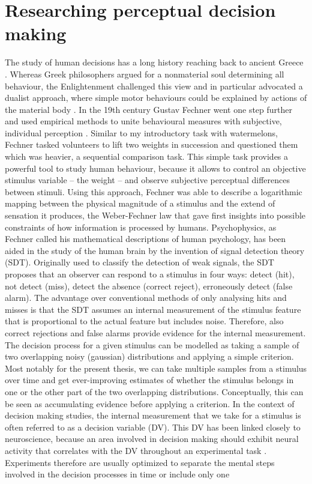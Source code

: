 \section{Researching perceptual decision making}
The study of human decisions has a long history reaching back to ancient Greece \parencite{Aristotle1987,Epicurus1940}. Whereas Greek philosophers argued for a nonmaterial soul determining all behaviour, the Enlightenment challenged this view and in particular \textcite{Descartes1649} advocated a dualist approach, where simple motor behaviours could be explained by actions of the material body \parencite{Descartes1664,Descartes1988}. In the 19th century Gustav Fechner went one step further and used empirical methods
\parencite{Bacon1620} to unite behavioural measures with subjective, individual perception \parencite{Fechner1860}. Similar to my introductory task with watermelons, Fechner tasked volunteers to lift two weights in succession and questioned them which was heavier, a sequential comparison task. This simple task provides a powerful tool to study human behaviour, because it allows to control an objective stimulus variable – the weight – and observe subjective perceptual differences between stimuli. Using this approach, Fechner was able to describe a logarithmic mapping between the physical magnitude of a stimulus and the extend of sensation it produces, the Weber-Fechner law that gave first insights into possible constraints of how information is processed by humans. Psychophysics, as Fechner called his mathematical descriptions of human psychology, has been aided in the study of the human brain by the invention of signal detection theory (SDT). Originally used to classify the detection of weak signals, the SDT proposes that an observer can respond to a stimulus in four ways: detect (hit), not detect (miss), detect the absence (correct reject), erroneously detect (false alarm). The advantage over conventional methods of only analysing hits and misses is that the SDT assumes an internal measurement of the stimulus feature that is proportional to the actual feature but includes noise. Therefore, also correct rejections and false alarms provide evidence for the internal measurement. The decision process for a given stimulus can be modelled as taking a sample of two overlapping noisy (gaussian) distributions and applying a simple criterion. Most notably for the present thesis, we can take multiple samples from a stimulus over time and get ever-improving estimates of whether the stimulus belongs in one or the other part of the two overlapping distributions. Conceptually, this can be seen as accumulating evidence before applying a criterion. In the context of decision making studies, the internal measurement that we take for a stimulus is often referred to as a decision variable (DV). This DV has been linked closely to neuroscience, because an area involved in decision making should exhibit neural activity that correlates with the DV throughout an experimental task \parencite{Tanner1954,Gold2007}. Experiments therefore are usually optimized to separate the mental steps involved in the decision processes in time or include only one 